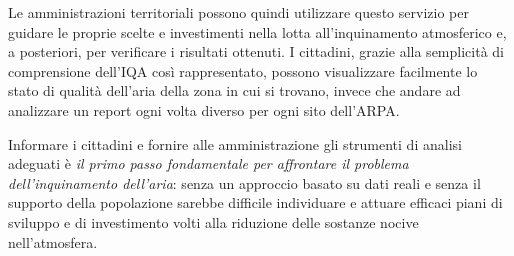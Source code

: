 Le amministrazioni territoriali possono quindi utilizzare questo servizio per
guidare le proprie scelte e investimenti nella lotta all'inquinamento
atmosferico e, a posteriori, per verificare i risultati ottenuti. I cittadini,
grazie alla semplicità di comprensione dell'IQA così rappresentato, possono
visualizzare facilmente lo stato di qualità dell'aria della zona in cui si
trovano, invece che andare ad analizzare un report ogni volta diverso per ogni
sito dell'ARPA.

Informare i cittadini e fornire alle amministrazione gli strumenti di analisi
adeguati è \emph{il primo passo fondamentale per affrontare il problema
dell'inquinamento dell'aria}: senza un approccio basato su dati reali e senza il
supporto della popolazione sarebbe difficile individuare e attuare efficaci
piani di sviluppo e di investimento volti alla riduzione delle sostanze nocive
nell'atmosfera.

